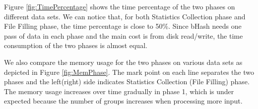 Figure \ref{fig:TimePercentage} shows the time percentage of the two phases on different data sets. We can notice that, for both Statistics Collection phase and File Filling phase, the time percentage is close to 50\%. Since bHash needs one pass of data in each phase and the main cost is from disk read/write, the time consumption of the two phases is almost equal.

We also compare the memory usage for the two phases on various data sets as depicted in Figure \ref{fig:MemPhase}. The mark point on each line separates the two phases and the left(right) side indicates Statistics Collection (File Filling) phase. The memory usage increases over time gradually in phase 1, which is under expected because the number of groups increases when processing more input. 


